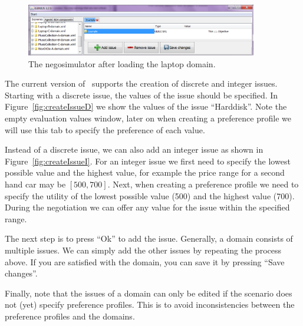 \documentclass[]{article}
\begin{document}
\begin{figure}[htb]
	\centering
	\includegraphics[width=0.9\textwidth]{media/image7.png}
\caption{The negosimulator after loading the laptop domain.}\label{Fig:newdomain}
\end{figure}

The current version of \Genius~supports the creation of discrete and integer issues. Starting with a discrete issue, the values of the issue should be specified. In Figure~\ref{fig:createIssueD} we show the values of the issue ``Harddisk''. Note the empty evaluation values window, later on when creating a preference profile we will use this tab to specify the preference of each value.

Instead of a discrete issue, we can also add an integer issue as shown in Figure~\ref{fig:createIssueI}. For an integer issue we first need to specify the lowest possible value and the highest value, for example the price range for a second hand car may be $[500, 700]$. Next, when creating a preference profile we need to specify the utility of the lowest possible value (500) and the highest value (700). During the negotiation we can offer any value for the issue within the specified range.

The next step is to press ``Ok'' to add the issue. Generally, a domain consists of multiple issues. We can simply add the other issues by repeating the process above. If you are satisfied with the domain, you can save it by pressing  ``Save changes''.

Finally, note that the issues of a domain can only be edited if the scenario does not (yet) specify preference profiles. This is to avoid inconsistencies between the preference profiles and the domains. 
\end{document}
